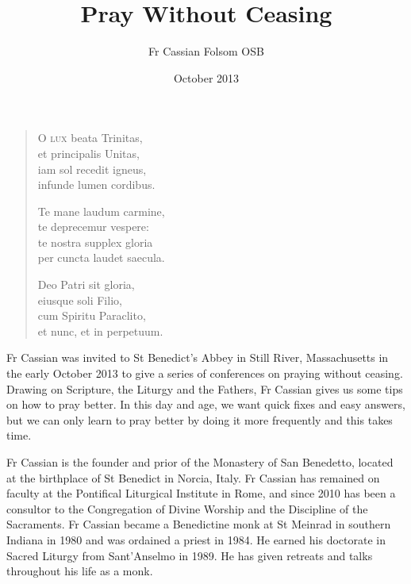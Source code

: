 \documentclass[10pt,a5paper]{book}
\title{Pray Without Ceasing}
\date{October 2013}
\author{Fr Cassian Folsom OSB}
\newenvironment{poem}
  {\begin{itshape}\begin{verse}
  }
  {\end{verse}\end{itshape}
  }
\begin{document}
\maketitle

\pagestyle{empty}

\begin{poem}
\textsc{O lux} beata Trinitas, \\
et principalis Unitas, \\
iam sol recedit igneus, \\
infunde lumen cordibus.

Te mane laudum carmine, \\
te deprecemur vespere: \\
te nostra supplex gloria \\
per cuncta laudet saecula.

Deo Patri sit gloria, \\
eiusque soli Filio, \\
cum Spiritu Paraclito, \\
et nunc, et in perpetuum.
\end{poem}

\newpage

Fr Cassian was invited to St Benedict's Abbey in Still River, Massachusetts in the early October 2013 to give a series of conferences on praying without ceasing. Drawing on Scripture, the Liturgy and the Fathers, Fr Cassian gives us some tips on how to pray better. In this day and age, we want quick fixes and easy answers, but we can only learn to pray better by doing it more frequently and this takes time.

Fr Cassian is the founder and prior of the Monastery of San Benedetto, located at the birthplace of St Benedict in Norcia, Italy. Fr Cassian has remained on faculty at the Pontifical Liturgical Institute in Rome, and since 2010 has been a consultor to the Congregation of Divine Worship and the Discipline of the Sacraments. Fr Cassian became a Benedictine monk at St Meinrad in southern Indiana in 1980 and was ordained a priest in 1984. He earned his doctorate in Sacred Liturgy from Sant'Anselmo in 1989. He has given retreats and talks throughout his life as a monk.


\end{document}
